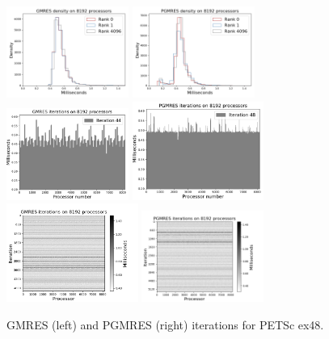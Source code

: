 \documentclass[sigconf]{acmart}
\begin{document}
\begin{figure}[t]
\centering
\includegraphics[width=4cm]{../plots/GMRES_ex48_8192_1000000_identical_in_p.png}
\includegraphics[width=4cm]{../plots/PGMRES_ex48_8192_1000000_identical_in_p.png} \\
\includegraphics[width=4cm]{../plots/GMRES_ex48_8192_1000000_independent_in_p_44.pdf}
\includegraphics[width=4.3cm]{../plots/PGMRES_ex48_8192_1000000_independent_in_p_48.pdf} \\
\includegraphics[width=4.3cm]{../plots/GMRES_ex48_8192_1000000_stationary_in_t_colormap.png} \includegraphics[width=4cm]{../plots/PGMRES_ex48_8192_1000000_stationary_in_t_colormap.png}
\caption{GMRES (left) and PGMRES (right) iterations for PETSc ex48.} \label{fig:ex48}
\end{figure}
\end{document}
